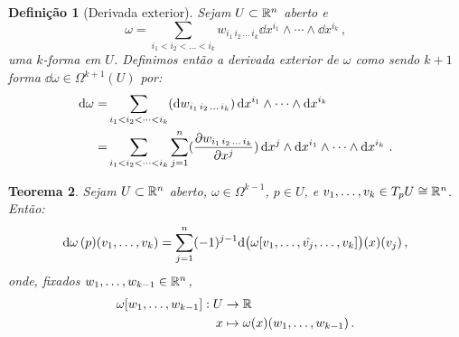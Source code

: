 \documentclass[a4paper,12pt]{extreport}
\newtheorem{mydef}{Definição}
\newtheorem{myteo}[mydef]{Teorema}
\newif\ifspacesbetweentheos
\newcommand{\theospace}[1]{
\ifspacesbetweentheos
  \vspace{#1}
\fi
}
\newcommand{\theonewpage}{
\ifspacesbetweentheos
  \newpage
\fi
}
\begin{document}
\theonewpage


\begin{mydef}[Derivada exterior]
  Sejam $U \subset \mathbb{R}^n$ aberto e
  \begin{equation}
    \omega = \sum_{i_1 < i_2 < \dots < i_k}
    w_{i_1\, i_2 \, \dots \, i_k}
    \dd{x^{i_1}} \wedge \cdots \wedge \dd{x^{i_k}} \,,
  \end{equation}
  uma $k$-forma em $U$.
  Definimos então a \emph{derivada exterior} de $\omega$
  como sendo $k+1$ forma $\dd{\omega} \in \Omega^{k+1}(U)$ por:
  \begin{equation}
    \begin{split}
      \dd{\omega} =& \sum_{i_1 < i_2 < \dots < i_k}
                     (\dd{w_{i_1 \, i_2 \, \dots \, i_k}})
                     \dd{x^{i_1}} \wedge \cdots \wedge \dd{x^{i_k}}\\
      =&
         \sum_{i_1 < i_2 < \dots < i_k}
         \sum_{j=1}^n
         (\pdv{w_{i_1 \, i_2 \, \dots \, i_k}}{x^j})
         \dd{x^j} \wedge \dd{x^{i_1}} \wedge \cdots \wedge \dd{x^{i_k}}\,.
    \end{split}
  \end{equation}

\end{mydef}


\theospace{3cm}


\begin{myteo}
  Sejam $U \subset \mathbb{R}^n$ aberto,
  $\omega \in \Omega^{k-1}$,
  $p \in U$,
  e $v_1, \dots, v_k \in T_pU \cong \mathbb{R}^n$.
  Então:
  \begin{equation}
    \dd{\omega} (p) (v_1, \dots, v_k) =
    \sum_{j=1}^n (-1)^{j-1}
    \dd \big(\omega\qty[v_1, \dots, \hat{v_j}, \dots, v_k]\big)
    (x)(v_j)\,,
  \end{equation}
  onde, fixados $w_1, \dots, w_{k-1} \in \mathbb{R}^n$,
  \begin{equation}
    \begin{split}
      \omega\qty[w_1, \dots, w_{k-1}] : U &\to \mathbb{R}\\
      x &\mapsto \omega(x)(w_1, \dots, w_{k-1})\,.
    \end{split}
  \end{equation}
  
\end{myteo}



\theospace{3cm}
\end{document}
